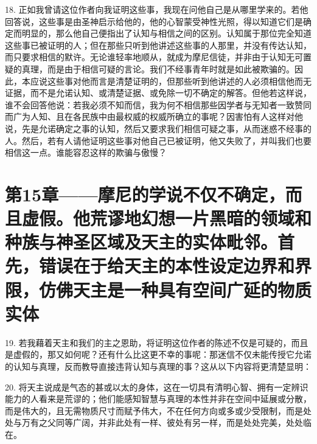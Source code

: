 18. 正如我曾请这位作者向我证明这些事，我现在问他自己是从哪里学来的。若他回答说，这些事是由圣神启示给他的，他的心智蒙受神性光照，得以知道它们是确定而明显的，那么他自己便指出了认知与相信之间的区别。认知属于那位完全知道这些事已被证明的人；但在那些只听到他讲述这些事的人那里，并没有传达认知，而只要求相信的默许。无论谁轻率地顺从，就成为摩尼信徒，并非由于认知无可置疑的真理，而是由于相信可疑的言论。我们不经事青年时就是如此被欺骗的。因此，本应说这些事对他而言是清楚证明的，但那些听到他讲述的人必须相信他而无证据，而不是允诺认知、或清楚证据、或免除一切不确定的解答。但他若这样说，谁不会回答他说：若我必须不知而信，我为何不相信那些因学者与无知者一致赞同而广为人知、且在各民族中由最权威的权威所确立的事呢？因害怕有人这样对他说，先是允诺确定之事的认知，然后又要求我们相信可疑之事，从而迷惑不经事的人。然后，若有人请他证明这些事对他自己已被证明，他又失败了，并叫我们也要相信这一点。谁能容忍这样的欺骗与傲慢？\par


\section{第15章——摩尼的学说不仅不确定，而且虚假。他荒谬地幻想一片黑暗的领域和种族与神圣区域及天主的实体毗邻。首先，错误在于给天主的本性设定边界和界限，仿佛天主是一种具有空间广延的物质实体}

19. 若我藉着天主和我们的主之恩助，将证明这位作者的陈述不仅是可疑的，而且是虚假的，那又如何呢？还有什么比这更不幸的事呢：那迷信不仅未能传授它允诺的认知与真理，反而教导直接违背认知与真理的事？这从以下内容将更清楚显明：\par

20. 将天主说成是气态的甚或以太的身体，这在一切具有清明心智、拥有一定辨识能力的人看来是荒谬的；他们能感知智慧与真理的本性并非在空间中延展或分散，而是伟大的，且无需物质尺寸而赋予伟大，不在任何方向或多或少受限制，而是处处与万有之父同等广阔，并非此处有一样、彼处有另一样，而是处处完美，处处临在。\par

